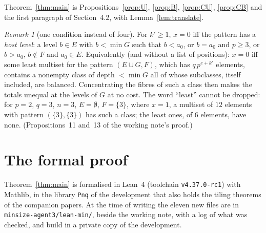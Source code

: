 \documentclass[11pt,a4paper]{amsart}
\theoremstyle{definition}
\theoremstyle{remark}
\newtheorem{remark}[theorem]{Remark}
\newcommand{\lean}[1]{\texttt{#1}}
\begin{document}
Theorem~\ref{thm:main} is Propositions~\ref{prop:U}, \ref{prop:B}, \ref{prop:CU}, \ref{prop:CB} and the first paragraph of Section~4.2, with Lemma~\ref{lem:translate}.

\begin{remark}[one condition instead of four]
For $k'\ge1$, $x=0$ iff the pattern has a \emph{host level}: a level $b\in E$ with $b<\min G$ such that
$b<a_0$, or $b=a_0$ and $p\ge3$, or $b>a_0$, $b\notin F$ and $a_0\in E$. Equivalently (and without a list of
positions): $x=0$ iff some least multiset for the pattern $(E\cup G,F)$, which has $q\,p^{e+k'}$ elements,
contains a nonempty class of depth $<\min G$ all of whose subclasses, itself included, are balanced. Concentrating the fibres
of such a class then makes the totals unequal at the levels of $G$ at no cost. The word ``least'' cannot be dropped: for $p=2$, $q=3$, $n=3$, $E=\emptyset$, $F=\{3\}$, where $x=1$, a multiset of $12$ elements with pattern $(\{3\},\{3\})$ has such a class; the least ones, of $6$ elements, have none. (Propositions~11 and~13 of the working note's proof.)
\end{remark}

\section{The formal proof}\label{sec:lean}

Theorem~\ref{thm:main} is formalised in Lean~4 (toolchain \lean{v4.37.0-rc1}) with Mathlib, in the library
\lean{Pnq} of the development that also holds the tiling theorems of the companion papers. At the time of writing the eleven new files are in \lean{minsize-agent3/lean-min/}, beside the working note,
with a log of what was checked, and build in a private copy of the development.
\end{document}
